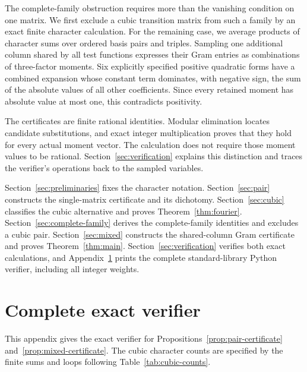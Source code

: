 \documentclass[11pt]{article}
\begin{document}
The complete-family obstruction requires more than the vanishing
condition on one matrix. We first exclude a cubic transition matrix
from such a family by an exact finite character calculation. For the
remaining case, we average products of character sums over ordered
basis pairs and triples. Sampling one additional column shared by all
test functions expresses their Gram entries as combinations of
three-factor moments.
Six explicitly specified positive quadratic forms have a combined
expansion whose constant term dominates, with negative sign, the sum
of the absolute values of all other coefficients. Since every retained
moment has absolute value at most one, this contradicts positivity.

The certificates are finite rational identities. Modular elimination
locates candidate substitutions, and exact integer multiplication proves
that they hold for every actual moment vector. The calculation does not
require those moment values to be rational. Section~\ref{sec:verification}
explains this distinction and traces the verifier's operations back to
the sampled variables.

Section~\ref{sec:preliminaries} fixes the character notation.
Section~\ref{sec:pair} constructs the single-matrix certificate and its
dichotomy. Section~\ref{sec:cubic} classifies the cubic alternative
and proves Theorem~\ref{thm:fourier}.
Section~\ref{sec:complete-family} derives the complete-family identities
and excludes a cubic pair. Section~\ref{sec:mixed} constructs the shared-column Gram
certificate and proves Theorem~\ref{thm:main}.
Section~\ref{sec:verification} verifies both exact calculations, and
Appendix~\ref{app:code} prints the complete standard-library Python
verifier, including all integer weights.








\clearpage
\appendix
\section{Complete exact verifier}\label{app:code}

This appendix gives the exact verifier for
Propositions~\ref{prop:pair-certificate} and~\ref{prop:mixed-certificate}.
The cubic character counts are specified by the finite sums and loops
following Table~\ref{tab:cubic-counts}.
\end{document}
